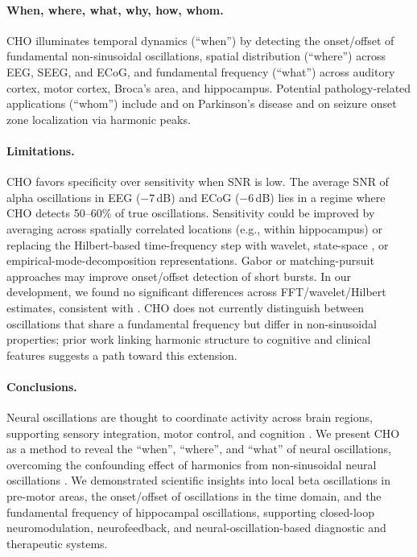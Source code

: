\documentclass[11pt]{article}
\begin{document}
\paragraph{When, where, what, why, how, whom.}
CHO illuminates temporal dynamics (``when'') by detecting the onset/offset of fundamental non-sinusoidal oscillations, spatial distribution (``where'') across EEG, SEEG, and ECoG, and fundamental frequency (``what'') across auditory cortex, motor cortex, Broca's area, and hippocampus. Potential pathology-related applications (``whom'') include \citet{cole2017} and \citet{jackson2019} on Parkinson's disease and \citet{hu2023} on seizure onset zone localization via harmonic peaks.

\paragraph{Limitations.}
CHO favors specificity over sensitivity when SNR is low. The average SNR of alpha oscillations in EEG ($-7$\,dB) and ECoG ($-6$\,dB) lies in a regime where CHO detects 50--60\% of true oscillations. Sensitivity could be improved by averaging across spatially correlated locations (e.g., within hippocampus) or replacing the Hilbert-based time-frequency step with wavelet, state-space \citep{matsuda2017,beck2022,brady2022,he2023}, or empirical-mode-decomposition \citep{fabus2022,quinn2021} representations. Gabor or matching-pursuit approaches \citep{kus2013,morales2022} may improve onset/offset detection of short bursts. In our development, we found no significant differences across FFT/wavelet/Hilbert estimates, consistent with \citet{bruns2004}. CHO does not currently distinguish between oscillations that share a fundamental frequency but differ in non-sinusoidal properties; prior work linking harmonic structure to cognitive and clinical features \citep{vandijk2010,schalk2015,mazaheri2008,cole2017,jackson2019,hu2023} suggests a path toward this extension.

\paragraph{Conclusions.}
Neural oscillations are thought to coordinate activity across brain regions, supporting sensory integration, motor control, and cognition \citep{buzsaki2004,fries2015}. We present CHO as a method to reveal the ``when'', ``where'', and ``what'' of neural oscillations, overcoming the confounding effect of harmonics from non-sinusoidal neural oscillations \citep{donoghue2022}. We demonstrated scientific insights into local beta oscillations in pre-motor areas, the onset/offset of oscillations in the time domain, and the fundamental frequency of hippocampal oscillations, supporting closed-loop neuromodulation, neurofeedback, and neural-oscillation-based diagnostic and therapeutic systems.



\end{document}
